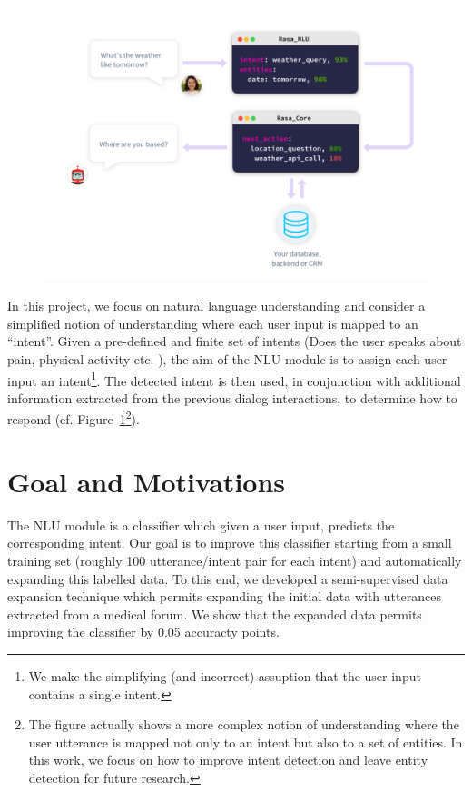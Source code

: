 \documentclass[11pt]{article}
\begin{document}
\begin{figure}[htbp]
\begin{center}
\includegraphics[width=.9\textwidth]{img/rasa.pdf}
\end{center}
\caption{}
\label{fig:rasa}
\end{figure}
In this project, we focus on natural language understanding and
consider a simplified notion of understanding where each user input is
mapped to an ``intent''. Given a pre-defined and finite set of intents
(Does the user speaks about pain, physical activity etc. ), the aim
of the NLU module is to assign each user input an intent\footnote{We
  make the simplifying (and incorrect) assuption that the user input
  contains a single intent.}. The detected intent is then used, in
conjunction with additional information extracted from the previous
dialog interactions, to determine how to
respond (cf. Figure~\ref{fig:rasa}\footnote{The figure
  actually shows a more complex notion of understanding where the user
  utterance is mapped not only to an intent but also to a set of
  entities. In this work, we focus on how to improve intent detection
  and leave entity detection for future research.}).

\section{Goal and Motivations}
\label{sec:goals}


The NLU module is a classifier which given a user input, predicts the
corresponding intent. Our goal is to improve this classifier starting
from a small training set (roughly 100 utterance/intent pair for each
intent) and automatically expanding this labelled data. To this
end, we developed a semi-supervised data expansion technique which
permits expanding the initial data with utterances extracted from a
medical forum. We show that the expanded data permits improving the
classifier by 0.05 accuracty points.
\end{document}
